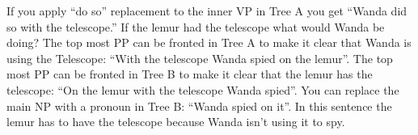 \documentclass[20pt]{article}
\begin{document}
If you apply ``do so'' replacement to the inner VP in Tree A you get ``Wanda
did so with the telescope.'' If the lemur had the telescope what would Wanda
be doing? The top most PP can be fronted in Tree A to make it clear that Wanda
is using the Telescope: ``With the telescope Wanda spied on the lemur''.
The top most PP can be fronted in Tree B to make it clear that the
lemur has the telescope: ``On the lemur with the telescope Wanda spied''. You
can replace the main NP with a pronoun in Tree B: ``Wanda spied on it''. In this
sentence the lemur has to have the telescope because Wanda isn't using it to spy.
\end{document}
